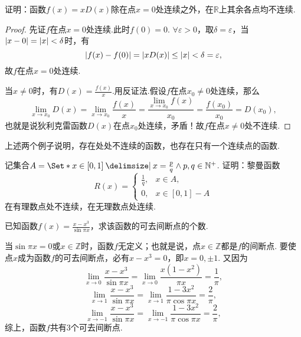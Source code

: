 \begin{example}
证明：函数\(f(x) = x D(x)\)除在点\(x = 0\)处连续之外，在\(\mathbb{R}\)上其余各点均不连续.
\begin{proof}
先证\(f\)在点\(x = 0\)处连续.此时\(f(0) = 0\).
\(\forall \varepsilon > 0\)，取\(\delta = \varepsilon\)，当\(\abs{x - 0} = \abs{x} < \delta\)时，有\[
\abs{f(x) - f(0)}
= \abs{ x D(x) }
\leq \abs{x} < \delta = \varepsilon,
\]故\(f\)在点\(x = 0\)处连续.

当\(x \neq 0\)时，有\(D(x) = \frac{f(x)}{x}\).用反证法.假设\(f\)在点\(x_0 \neq 0\)处连续，那么\[
\lim\limits_{x \to x_0} D(x) = \lim\limits_{x \to x_0} \frac{f(x)}{x}
= \frac{ \lim\limits_{x \to x_0} f(x) }{x_0}
= \frac{f(x_0)}{x_0} = D(x_0),
\]也就是说狄利克雷函数\(D(x)\)在点\(x_0\)处连续，矛盾！故\(f\)在点\(x \neq 0\)处不连续.
\end{proof}
\end{example}

上述两个例子说明，存在处处不连续的函数，也存在只有一个连续点的函数.

\begin{example}
记集合\(A = \Set*{ x\in[0,1] \given x = \frac{p}{q} \land p,q\in\mathbb{N}^+ }\).
证明：黎曼函数\[
R(x) = \left\{ \begin{array}{cl}
\frac{1}{q}, & x \in A, \\
0, & x \in [0,1] - A
\end{array} \right.
\]在有理数点处不连续，在无理数点处连续.
\end{example}

\begin{example}
已知函数\(f(x) = \frac{x-x^3}{\sin \pi x}\)，求该函数的可去间断点的个数.
\begin{solution}
当\(\sin \pi x = 0\)或\(x \in \mathbb{Z}\)时，函数\(f\)无定义；也就是说，点\(x\in\mathbb{Z}\)都是\(f\)的间断点.
要使点\(x\)成为函数\(f\)的可去间断点，必有\(x-x^3=0\)，即\(x=0,\pm1\).
\def\l#1{\lim\limits_{x\to#1}}%
又因为\[
\l{0} \frac{x-x^3}{\sin \pi x}
= \l{0} \frac{x(1-x^2)}{\pi x}
= \frac{1}{\pi},
\]\[
\l{1} \frac{x-x^3}{\sin \pi x}
= \l{1} \frac{1-3x^2}{\pi \cos \pi x}
= \frac{2}{\pi},
\]\[
\l{-1} \frac{x-x^3}{\sin \pi x}
= \l{-1} \frac{1-3x^2}{\pi \cos \pi x}
= \frac{2}{\pi},
\]综上，函数\(f\)共有3个可去间断点.
\end{solution}
\end{example}

